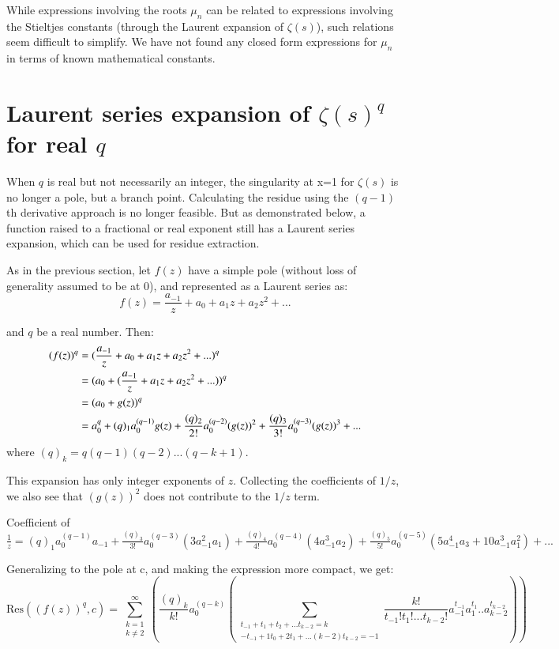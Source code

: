 \documentclass[a4paper,11pt,twoside]{amsart}
\newcommand\Res{\mathrm{Res}}
\begin{document}
While expressions involving the roots $\mu_n$ can be related to expressions involving the Stieltjes constants (through the Laurent expansion of $\zeta(s)$), such relations seem difficult to simplify. We have not found any closed form expressions for $\mu_n$ in terms of known mathematical constants.

\section{Laurent series expansion of $\zeta(s)^q$ for real $q$}
When $q$ is real but not necessarily an integer, the singularity at x=1 for $\zeta(s)$ is no longer a pole, but a branch point. Calculating the residue using the $(q-1)$th derivative approach is no longer feasible. But as demonstrated below, a function raised to a fractional or real exponent still has a Laurent series expansion, which can be used for residue extraction.

As in the previous section, let $f(z)$ have a simple pole (without loss of generality assumed to be at 0), and represented as a Laurent series as:
$$f(z) = \frac{a_{-1}}{z} + a_0 + a_1 z + a_2 z^2 + ...$$

and $q$ be a real number. Then:
\begin{align}
(f(z))^q &= (\frac{a_{-1}}{z} + a_0 + a_1 z + a_2 z^2 + ...)^q \notag\\
&= (a_0 + (\frac{a_{-1}}{z} + a_1 z + a_2 z^2 + ...))^q\notag\\
&= (a_0 + g(z))^q\notag\\
&= a_{0}^q + (q)_{1} a_{0}^{(q-1)} g(z) + \frac{(q)_{2}}{2!} a_{0}^{(q-2)} (g(z))^2 + \frac{(q)_{3}}{3!} a_{0}^{(q-3)} (g(z))^3 + ...\notag
\notag
\end{align}
where $(q)_k = q(q-1)(q-2)...(q-k+1)$.

This expansion has only integer exponents of $z$. Collecting the coefficients of $1/z$, we also see that $(g(z))^2$ does not contribute to the $1/z$ term.

Coefficient of $\frac{1}{z} = (q)_{1} a_{0}^{(q-1)} a_{-1} + \frac{(q)_{3}}{3!} a_{0}^{(q-3)} (3 a_{-1}^2 a_1) + \frac{(q)_{4}}{4!} a_{0}^{(q-4)} (4 a_{-1}^3 a_2) + \frac{(q)_{5}}{5!} a_{0}^{(q-5)} (5 a_{-1}^4 a_3 + 10 a_{-1}^3 a_{1}^2) + ...$

Generalizing to the pole at c, and making the expression more compact, we get: 
$$\Res((f(z))^q,c) = \sum\limits_{\substack{k=1 \\ k \ne 2}}^{\infty} \left(\frac{(q)_{k}}{k!} a_{0}^{(q-k)} \left(\sum\limits_{\substack{t_{-1} + t_1 + t_2 + ... t_{k-2} = k \\ -t_{-1} + 1t_0 + 2t_1 + ... (k-2)t_{k-2} = -1}} \frac{k!}{t_{-1}!t_{1}!...t_{k-2}!} a_{-1}^{t_{-1}} a_{1}^{t_1}..a_{k-2}^{t_{k-2}}\right)\right)$$
\end{document}
